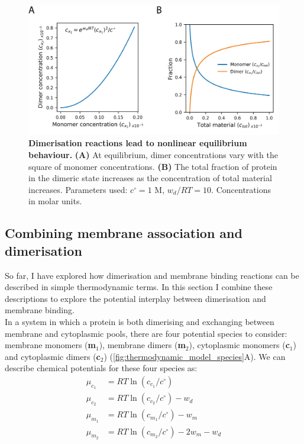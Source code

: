 \documentclass[12pt]{"report"}
\newcommand{\mycaption}[2]{\caption[#1]{\textbf{#1.} #2}}
\begin{document}
\begin{figure}
\includegraphics[scale=1]{thermodynamic_simple_dimer}
\centering
\mycaption{Dimerisation reactions lead to nonlinear equilibrium behaviour}{
\textbf{(A)} At equilibrium, dimer concentrations vary with the square of monomer concentrations.
\textbf{(B)} The total fraction of protein in the dimeric state increases as the concentration of total material increases. Parameters used: $c^{\circ} = 1$ M, $w_d / RT = 10$. Concentrations in molar units.}
\label{fig:thermodynamic_simple_dimer}
\end{figure}


\subsection{Combining membrane association and dimerisation}

So far, I have explored how dimerisation and membrane binding reactions can be described in simple thermodynamic terms. In this section I combine these descriptions to explore the potential interplay between dimerisation and membrane binding.\\

In a system in which a protein is both dimerising and exchanging between membrane and cytoplasmic pools, there are four potential species to consider: membrane monomers (\textbf{m$_1$}), membrane dimers (\textbf{m$_2$}), cytoplasmic monomers (\textbf{c$_1$}) and cytoplasmic dimers (\textbf{c$_2$}) (\cref{fig:thermodynamic_model_species}A). We can describe chemical potentials for these four species as:
\begin{align}
\mu_{c_1} &= RT\ln(c_{c_1} / c^{\circ})\\
\mu_{c_2} &= RT\ln(c_{c_2} / c^{\circ}) - w_d\\
\mu_{m_1} &= RT\ln(c_{m_1} / c^{\circ}) - w_m\\
\mu_{m_2} &= RT\ln(c_{m_2} / c^{\circ}) - 2w_m - w_d
\end{align}
\end{document}

